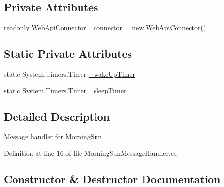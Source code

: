 \subsection*{Private Attributes}
\begin{DoxyCompactItemize}
\item 
readonly \mbox{\hyperlink{class_master_application_1_1_web_api_connector}{Web\+Api\+Connector}} \mbox{\hyperlink{class_master_application_1_1_message_handlers_1_1_morning_sun_message_handler_ad9bf8d647f3f953c7182253ddd92b60b}{\+\_\+connector}} = new \mbox{\hyperlink{class_master_application_1_1_web_api_connector}{Web\+Api\+Connector}}()
\end{DoxyCompactItemize}
\subsection*{Static Private Attributes}
\begin{DoxyCompactItemize}
\item 
static System.\+Timers.\+Timer \mbox{\hyperlink{class_master_application_1_1_message_handlers_1_1_morning_sun_message_handler_a382feec4ea46d0b019256595c90bab22}{\+\_\+wake\+Up\+Timer}}
\item 
static System.\+Timers.\+Timer \mbox{\hyperlink{class_master_application_1_1_message_handlers_1_1_morning_sun_message_handler_aebb59a81c651514469a9caab1f0289e3}{\+\_\+sleep\+Timer}}
\end{DoxyCompactItemize}


\subsection{Detailed Description}
Message handler for Morning\+Sun. 

Definition at line 16 of file Morning\+Sun\+Message\+Handler.\+cs.



\subsection{Constructor \& Destructor Documentation}
\mbox{\label{class_master_application_1_1_message_handlers_1_1_morning_sun_message_handler_ac4e1e473b2e8f7ae2f8bf1b5d6059e6b}} 
